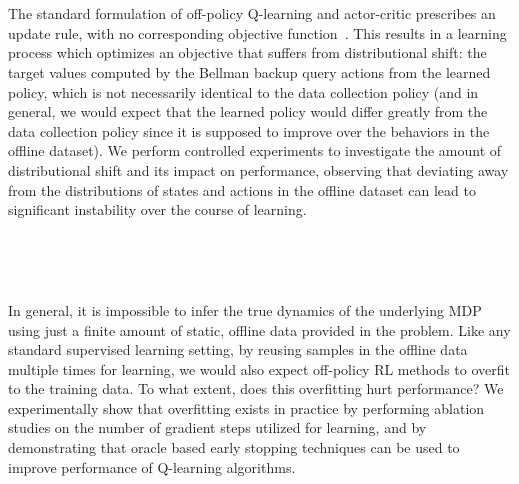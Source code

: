 ~


~

The standard formulation of off-policy Q-learning and actor-critic prescribes an update rule, with no corresponding objective function~\citep{Sutton09b}. This results in a learning process which optimizes an objective that suffers from distributional shift: the target values computed by the Bellman backup query actions from the learned policy, which is not necessarily identical to the data collection policy (and in general, we would expect that the learned policy would differ greatly from the data collection policy since it is supposed to improve over the behaviors in the offline dataset). We perform controlled experiments to investigate the amount of distributional shift and its impact on performance, observing that deviating away from the distributions of states and actions in the offline dataset can lead to significant instability over the course of learning.

~


~

In general, it is impossible to infer the true dynamics of the underlying MDP using just a finite amount of static, offline data provided in the problem. Like any standard supervised learning setting, by reusing samples in the offline data multiple times for learning, we would also expect off-policy RL methods to overfit to the training data. To what extent, does this overfitting hurt performance? We experimentally show that overfitting exists in practice by performing ablation studies on the number of gradient steps utilized for learning, and by demonstrating that oracle based early stopping techniques can be used to improve performance of Q-learning algorithms.


